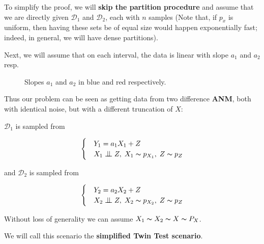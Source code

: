 To simplify the proof, we will \textbf{skip the partition procedure} and assume that
we are directly given $\mathcal{D}_1$ and $\mathcal{D}_2$, each with 
$n$ samples (Note that, if $p_x$ is uniform, then having these sets be of equal size would happen exponentially 
fast; indeed, in general, we will have dense partitions). 

Next, we will assume that on each interval, the data is linear with slope $a_1$ and $a_2$ resp. 

\begin{figure}[!h]
    \centering
      \caption{Slopes $a_1$ and $a_2$ in blue and red respectively.}
\end{figure}

Thus our problem can be seen as getting data from two difference \textbf{ANM}, both with identical noise, but with 
a different truncation of $X$:

$\mathcal{D}_1$ is sampled from 

\[ \begin{cases} 
    & Y_1 = a_1 X_1 + Z  \\
    & X_1 \bigCI Z,\; X_1 \thicksim p_{X_1},\; Z \thicksim p_{Z}  
 \end{cases}
\]

and $\mathcal{D}_2$ is sampled from 

\[ \begin{cases} 
    & Y_2 = a_2 X_2 + Z  \\
    & X_2 \bigCI Z,\; X_2 \thicksim p_{X_2},\; Z \thicksim p_{Z}  
 \end{cases}
\]

Without loss of generality we can assume $X_1 \thicksim X_2 \thicksim X \thicksim P_X$.

We will call this scenario the \textbf{simplified Twin Test scenario}. 

